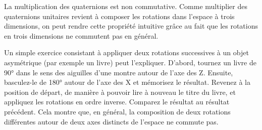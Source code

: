 La multiplication des quaternions est non commutative. Comme multiplier des quaternions
unitaires revient à composer les rotations dans l'espace à trois dimensions, 
on peut rendre cette propriété intuitive grâce au fait que les rotations en trois dimensions ne commutent pas en général.

Un simple exercice consistant à appliquer deux rotations successives à un objet
asymétrique (par exemple un livre) peut l'expliquer. D'abord, tournez un livre 
de \ang{90} dans le sens des aiguilles d'une montre autour de l'axe des Z. 
Ensuite, basculez-le de \ang{180} autour de l'axe des X et mémorisez le résultat. Revenez à la position de départ, de manière à pouvoir lire à nouveau le titre du livre,
et appliquez les rotations en ordre inverse. 
Comparez le résultat au résultat précédent. Cela montre que, en général, 
la composition de deux rotations différentes autour de deux axes distincts de l'espace 
ne commute pas.